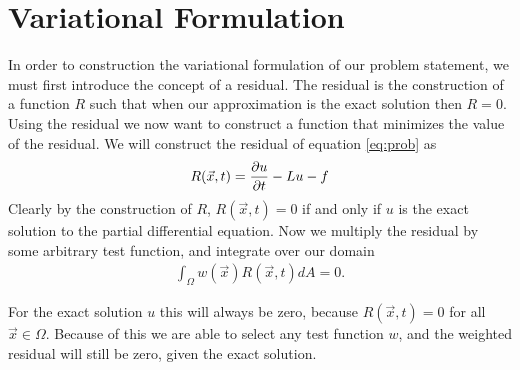 \documentclass[../fem.tex]{subfile}
\begin{document}
\section{Variational Formulation}%
\label{sec:variational_formulation}

In order to construction the variational formulation of our problem statement,
we must first introduce the concept of a residual. The residual is the
construction of a function $R$ such that when our approximation is the exact
solution then $R=0$. Using the residual we now want to construct a function
that minimizes the value of the residual. We will construct the residual of
equation \ref{eq:prob} as
\begin{align*}
  R(\vec{x},t)=\frac{\partial u}{\partial t}-Lu-f
\end{align*}
Clearly by the construction of $R$, $R(\vec{x},t)=0$ if and only if $u$ is the
exact solution to the partial differential equation. Now we multiply the
residual by some arbitrary test function, and integrate over our domain
\begin{align*}
  \int_\Omega w(\vec{x})R(\vec{x},t)dA=0.
\end{align*}

For the exact solution $u$ this will always be zero, because $R(\vec{x},t)=0$
for all $\vec{x}\in\Omega$. Because of this we are able to select any test
function $w$, and the weighted residual will still be zero, given the exact
solution.
\end{document}
